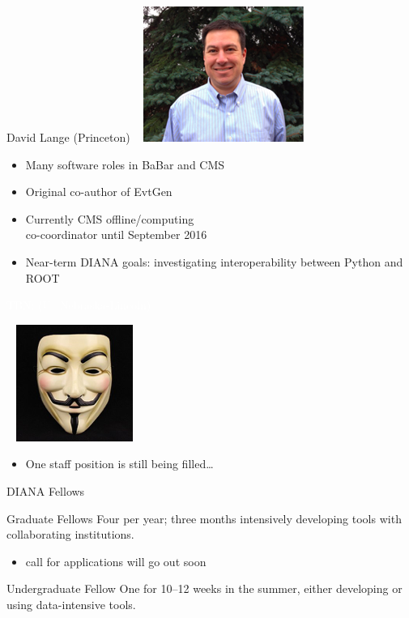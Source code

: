 \documentclass{beamer}
\begin{document}
\begin{frame}{David Lange (Princeton)}
\vspace{0.25 cm}
\mbox{ } \hfill \includegraphics[height=2 cm]{david_lange.png}

\vspace{-2 cm}
\begin{itemize}
\item Many software roles in BaBar and CMS
\item Original co-author of EvtGen
\item Currently CMS offline/computing \\ co-coordinator until September 2016
\item Near-term DIANA goals: investigating interoperability between Python and ROOT
\end{itemize}

\vspace{1.25 cm}

\vspace{-0.3 cm}
\hspace{-0.83 cm} \textcolor{white}{\Large TBN: (U.\ Nebraska-Lincoln)}

\vspace{0.25 cm}
\mbox{ } \hfill \includegraphics[height=2 cm]{guy_fawkes.png}

\vspace{-2 cm}
\begin{itemize}
\item One staff position is still being filled\ldots
\end{itemize}
\end{frame}

\begin{frame}{DIANA Fellows}
\begin{block}{Graduate Fellows}
Four per year; three months intensively developing tools with collaborating institutions.
\begin{itemize}
\item call for applications will go out soon
\end{itemize}
\end{block}

\vfill
\begin{block}{Undergraduate Fellow}
One for 10--12 weeks in the summer, either developing or using data-intensive tools.
\end{block}
\end{frame}
\end{document}
